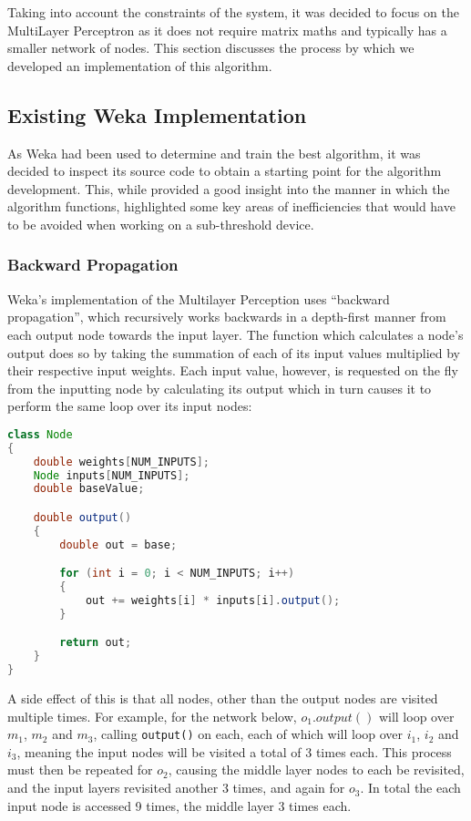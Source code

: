 
Taking into account the constraints of the system, it was decided to focus on the MultiLayer Perceptron as it does not require matrix maths and typically has a smaller network of nodes. This section discusses the process by which we developed an implementation of this algorithm.

\subsection{Existing Weka Implementation \label{sec:weka-code}}

As Weka had been used to determine and train the best algorithm, it was decided to inspect its source code to obtain a starting point for the algorithm development. This, while provided a good insight into the manner in which the algorithm functions, highlighted some key areas of inefficiencies that would have to be avoided when working on a sub-threshold device.

\subsubsection{Backward Propagation}

Weka's implementation of the Multilayer Perception uses ``backward propagation'', which recursively works backwards in a depth-first manner from each output node towards the input layer. The function which calculates a node's output does so by taking the summation of each of its input values multiplied by their respective input weights. Each input value, however, is requested on the fly from the inputting node by calculating its output which in turn causes it to perform the same loop over its input nodes:

\begin{lstlisting}[language=Java,caption={Weka's method of calculating a node's output}]
class Node
{
    double weights[NUM_INPUTS];
    Node inputs[NUM_INPUTS];
    double baseValue;

    double output()
    {
        double out = base;

        for (int i = 0; i < NUM_INPUTS; i++)
        {
            out += weights[i] * inputs[i].output();
        }

        return out;
    }
}
\end{lstlisting}

A side effect of this is that all nodes, other than the output nodes are visited multiple times. For example, for the network below, $o_1.output()$ will loop over $m_1$, $m_2$ and $m_3$, calling \verb|output()| on each, each of which will loop over $i_1$, $i_2$ and $i_3$, meaning the input nodes will be visited a total of 3 times each. This process must then be repeated for $o_2$, causing the middle layer nodes to each be revisited, and the input layers revisited another 3 times, and again for $o_3$. In total the each input node is accessed 9 times, the middle layer 3 times each.

